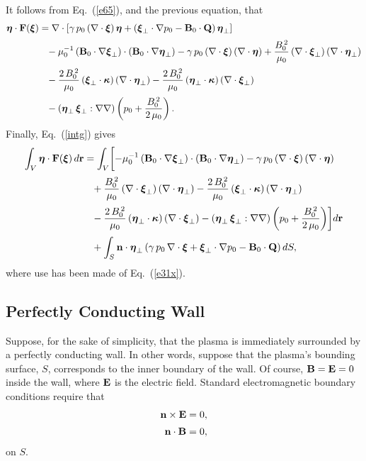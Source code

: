 \documentclass[12pt,prb,aps,notitlepage]{revtex4-1}
\newcommand{\bxi}{\mbox{\boldmath$\xi$}}
\newcommand{\bta}{\mbox{\boldmath$\eta$}}
\newcommand{\bkappa}{\mbox{\boldmath$\kappa$}}
\begin{document}
It follows from Eq.~(\ref{e65}), and the previous equation, that 
 \begin{align}
 \bta\cdot {\bf F}(\bxi) &=\nabla\cdot\left[\gamma\,p_0\,(\nabla\cdot\bxi)\,\bta+ (\bxi_\perp\cdot\nabla p_0-{\bf B}_0\cdot{\bf Q})\,\bta_\perp\right]\nonumber\\[0.5ex]
&\phantom{=}
  - \mu_0^{-1}\,({\bf B}_0\cdot\nabla\bxi_\perp)\cdot
 ({\bf B}_0\cdot\nabla\bta_\perp)-\gamma\,p_0\,(\nabla\cdot\bxi)\,(\nabla\cdot\bta)+\frac{B_0^{\,2}}{\mu_0}\,(\nabla\cdot\bxi_\perp)\,(\nabla\cdot\bta_\perp) 
\nonumber\\[0.5ex]
 &\phantom{=}-\frac{2\,B_0^{\,2}}{\mu_0}\,(\bxi_\perp\cdot\bkappa)\, (\nabla\cdot\bta_\perp)-\frac{2\,B_0^{\,2}}{\mu_0}\,(\bta_\perp\cdot\bkappa)\,(\nabla\cdot\bxi_\perp)\nonumber\\[0.5ex]
 &\phantom{=}
 -(\bta_\perp\,\bxi_\perp : \nabla\nabla)\left(p_0 + \frac{B_0^{\,2}}{2\,\mu_0}\right).
\end{align}
Finally, Eq.~(\ref{intg}) gives 
 \begin{align}\label{e83d}
\int_V \bta\cdot{\bf F}(\bxi)\,d{\bf r} &=\int_V \biggl[- \mu_0^{-1}\,({\bf B}_0\cdot\nabla\bxi_\perp)\cdot
 ({\bf B}_0\cdot\nabla\bta_\perp)-\gamma\,p_0\,(\nabla\cdot\bxi)\,(\nabla\cdot\bta)
\nonumber\\[0.5ex]
 &\phantom{=}+\frac{B_0^{\,2}}{\mu_0}\,(\nabla\cdot\bxi_\perp)\,(\nabla\cdot\bta_\perp) -\frac{2\,B_0^{\,2}}{\mu_0}\,(\bxi_\perp\cdot\bkappa)\, (\nabla\cdot\bta_\perp)\nonumber\\[0.5ex]
 &\phantom{=}
 -\frac{2\,B_0^{\,2}}{\mu_0}\,(\bta_\perp\cdot\bkappa)\,(\nabla\cdot\bxi_\perp)-(\bta_\perp\,\bxi_\perp : \nabla\nabla)\left(p_0 + \frac{B_0^{\,2}}{2\,\mu_0}\right)\biggr]d{\bf r}\nonumber\\[0.5ex]
 &\phantom{=}+ \int_S {\bf n}\cdot\bta_\perp\left(\gamma\,p_0\,\nabla\cdot\bxi + \bxi_\perp\cdot\nabla p_0 - {\bf B}_0\cdot{\bf Q}\right)dS,
\end{align}
where use has been made of Eq.~(\ref{e31x}).

\subsection{Perfectly Conducting Wall}
Suppose, for the sake of simplicity, that the plasma is immediately surrounded by a perfectly conducting wall. In other words, suppose that the plasma's bounding surface, $S$, corresponds to the inner
boundary of the wall. Of course, ${\bf B}= {\bf E}=0$ inside the wall, where ${\bf E}$ is the electric field. 
Standard electromagnetic boundary conditions 
require that
\begin{align}\label{e27a}
{\bf n}\times {\bf E}&= 0,\\[0.5ex]
{\bf n} \cdot {\bf B}&=0,\label{e27b}
\end{align}
on $S$. 
\end{document}
